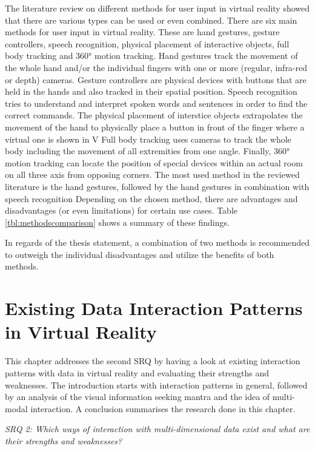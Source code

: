 The literature review on different methods for user input in virtual reality showed that there are various types can be used or even combined. \newline
There are six main methods for user input in virtual reality. These are hand gestures, gesture controllers, speech recognition, physical placement of interactive objects, full body tracking and 360° motion tracking. Hand gestures track the movement of the whole hand and/or the individual fingers with one or more (regular, infra-red or depth) cameras. Gesture controllers are physical devices with buttons that are held in the hands and also tracked in their spatial position. Speech recognition tries to understand and interpret spoken words and sentences in order to find the correct commands. The physical placement of interstice objects extrapolates the movement of the hand to physically place a button in front of the finger where a virtual one is shown in V Full body tracking uses cameras to track the whole body including the movement of all extremities from one angle. Finally, 360° motion tracking can locate the position of special devices within an actual room on all three axis from opposing corners. The most used method in the reviewed literature is the hand gestures, followed by the hand gestures in combination with speech recognition \newline
Depending on the chosen method, there are advantages and disadvantages (or even limitations) for certain use cases. Table \ref{tbl:methodscomparison} shows a summary of these findings.

In regards of the thesis statement, a combination of two methods is recommended to outweigh the individual disadvantages and utilize the benefits of both methods.



\section{Existing Data Interaction Patterns in Virtual Reality}

\label{SectionLiteratureReviewSRQ2}

This chapter addresses the second SRQ by having a look at existing interaction patterns with data in virtual reality and evaluating their strengths and weaknesses. The introduction starts with interaction patterns in general, followed by an analysis of the visual information seeking mantra and the idea of multi-modal interaction. A conclusion summarises the research done in this chapter.
\begin{framed}
	\textit{SRQ 2: Which ways of interaction with multi-dimensional data exist and what are their strengths and weaknesses?}
\end{framed}

